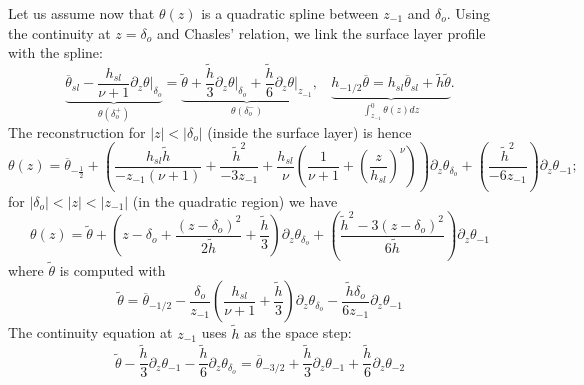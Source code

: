 Let us assume now that  $\theta(z)$ is a quadratic spline between
$z_{-1}$ and $\delta_o$.
Using the continuity at $z=\delta_o$ and Chasles' relation,
we link the surface layer profile with the spline:
\begin{equation}
\underbrace{
    \overline{\theta}_{sl} -
    \frac{h_{sl}}{\nu+1}\left. \partial_z \theta
    \right|_{\delta_o}}_{\theta(\delta_o^{+})}
    =
    \underbrace{
    \widetilde{\theta}
    + \frac{\widetilde{h}}{3}
    \left.\partial_z \theta\right|_{\delta_o}
    + \frac{\widetilde{h}}{6}
	\left.\partial_z \theta\right|_{z_{-1}}}_{
	\theta(\delta_o^{-})}
	,
    ~~~~
	\underbrace{
    h_{-1/2} \overline{\theta} = 
    h_{sl}\overline{\theta}_{sl} +\widetilde{h}
    \widetilde{\theta}}_{
    \int_{z_{-1}}^{0}\theta(z) dz
    }.
\end{equation}
The reconstruction for $|z|<|\delta_o|$ (inside the surface layer) is hence
\begin{equation}
    \theta(z) =
    \overline{\theta}_{-\frac{1}{2}}
    +
	\left(\frac{h_{sl}\widetilde{h}}{-z_{-1}(\nu+1)} +
	\frac{\widetilde{h}^2}{-3 z_{-1}}
    +
    \frac{h_{sl}}{\nu}\left(
    \frac{1}{\nu+1} + \left(\frac{z}{h_{sl}}
    \right)^\nu
    \right)\right) \partial_z \theta_{\delta_o}
    +
	\left(\frac{\widetilde{h}^2}{-6 z_{-1}}\right)
    \partial_z \theta_{-1};
\end{equation}
for $|\delta_o| < |z| < |z_{-1}|$
(in the quadratic region) we have
\begin{equation}
    \theta(z) =
        \widetilde{\theta}
        +
        \left(
        z-\delta_o + 
        \frac{(z-\delta_o)^2}{2\widetilde{h}}
        + \frac{\widetilde{h}}{3}
        \right)\partial_z \theta_{\delta_o}
        +
        \left(
        \frac{\widetilde{h}^2 - 
        3(z-\delta_o)^2}{6 \widetilde{h}}
        \right)\partial_z \theta_{-1}
\end{equation}
where $\widetilde{\theta}$ is computed with
\begin{equation}
\label{eq:formulaTildeTheta}
\widetilde{\theta} = \overline{\theta}_{-1/2}
	-\frac{\delta_o}{z_{-1}}\left(
\frac{h_{sl}}{\nu+1} + \frac{\widetilde{h}}{3}
\right)\partial_z \theta_{\delta_o}
	- \frac{\widetilde{h}\delta_o}{6z_{-1}}
\partial_z \theta_{-1}
\end{equation}
The continuity equation at $z_{-1}$
uses $\widetilde{h}$
as the space step:
\begin{equation}
    \widetilde{\theta}
    - \frac{\widetilde{h}}{3}
    \partial_z \theta_{-1}
    - \frac{\widetilde{h}}{6}
    \partial_z \theta_{\delta_o}
    = \overline{\theta}_{-3/2}
    + \frac{\widetilde{h}}{3}
    \partial_z \theta_{-1}
    + \frac{\widetilde{h}}{6}
    \partial_z \theta_{-2}
\end{equation}
